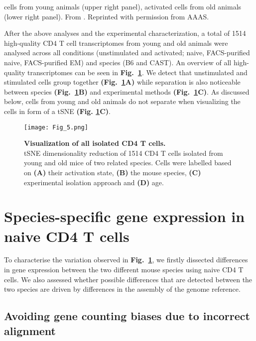 {cells from young animals (upper right panel), activated cells from old animals (lower right panel). From \citep{Martinez-jimenez2017}. Reprinted with permission from AAAS.\\}
\captionsetup[figure]{list=yes}

After the above analyses and the experimental characterization, a total of 1514 high-quality CD4\plus{} T cell transcriptomes from young and old animals were analysed across all conditions (unstimulated and activated; naive, FACS-purified naive, FACS-purified EM) and species (B6 and CAST). An overview of all high-quality transcriptomes can be seen in \textbf{Fig.~\ref{fig1:all_cells}}. We detect that unstimulated and stimulated cells group together \textbf{(Fig.~\ref{fig1:all_cells}A)} while separation is also noticeable between species \textbf{(Fig.~\ref{fig1:all_cells}B)} and experimental methods \textbf{(Fig.~\ref{fig1:all_cells}C)}. As discussed below, cells from young and old animals do not separate when visualizing the cells in form of a tSNE  \textbf{(Fig. \ref{fig1:all_cells}C)}. 

\newpage

\begin{figure}[!hb]
\centering
\texttt{[image: Fig\_5.png]}
\caption[Visualization of all isolated CD4\plus{} T cells]{\textbf{Visualization of all isolated CD4\plus{} T cells.}\\
tSNE dimensionality reduction of 1514 CD4\plus{} T cells isolated from young and old mice of two related species. Cells were labelled based on \textbf{(A)} their activation state, \textbf{(B)} the mouse species, \textbf{(C)} experimental isolation approach and \textbf{(D)} age.}
\label{fig1:all_cells}
\end{figure}

\newpage

\section{Species-specific gene expression in naive CD4\plus{} T cells}

To characterise the variation observed in \textbf{Fig.~\ref{fig1:all_cells}}, we firstly dissected differences in gene expression between the two different mouse species using naive CD4\plus{} T cells. We also assessed whether possible differences that are detected between the two species are driven by differences in the assembly of the genome reference.

\subsection{Avoiding gene counting biases due to incorrect alignment}

